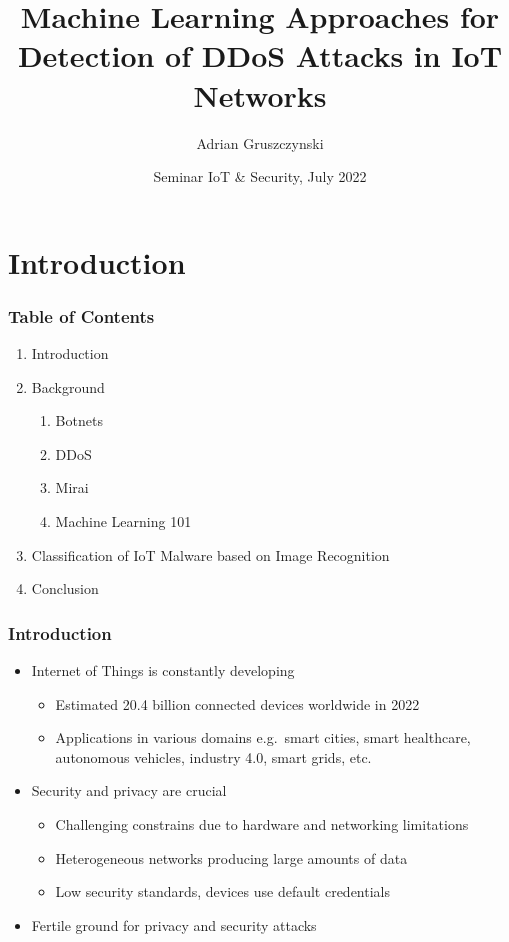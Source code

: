 \documentclass[10pt, presentation]{beamer}
\title[Machine Learning Approaches for Detection of DDoS Attacks in IoT Networks] %
{Machine Learning Approaches for Detection of DDoS Attacks in IoT Networks}
\subtitle{}
\author[Adrian Gruszczynski] %
{Adrian Gruszczynski}
\institute[Freie Universität Berlin] %
{
  Institute of Computer Science\\
  Freie Universität Berlin
}
\date[2022] %
{Seminar IoT \& Security, July 2022}
\begin{document}
\frame{\titlepage}
%
%
%
\section{Introduction}
    \begin{frame}
        \frametitle{Table of Contents}
        \begin{enumerate}
            \item Introduction
            \item Background
            \begin{enumerate}
                \item Botnets
                \item DDoS
                \item Mirai
                \item Machine Learning 101
            \end{enumerate}
            \item Classification of IoT Malware based on Image Recognition
            \item Conclusion
        \end{enumerate}
    \end{frame}

\begin{frame}
\frametitle{Introduction}
  \begin{itemize}
    \item Internet of Things is constantly developing
      \begin{itemize}
          \item Estimated 20.4 billion connected devices worldwide in 2022\ \cite{WEBSITE:1}
          \item Applications in various domains e.g.\ smart cities, smart healthcare, autonomous vehicles, industry 4.0, smart grids, etc.
      \end{itemize}
      \item Security and privacy are crucial
      \begin{itemize}
          \item Challenging constrains due to hardware and networking limitations
          \item Heterogeneous networks producing large amounts of data
          \item Low security standards, devices use default credentials
      \end{itemize}
    \item Fertile ground for privacy and security attacks
  \end{itemize}
\end{frame}
\end{document}
